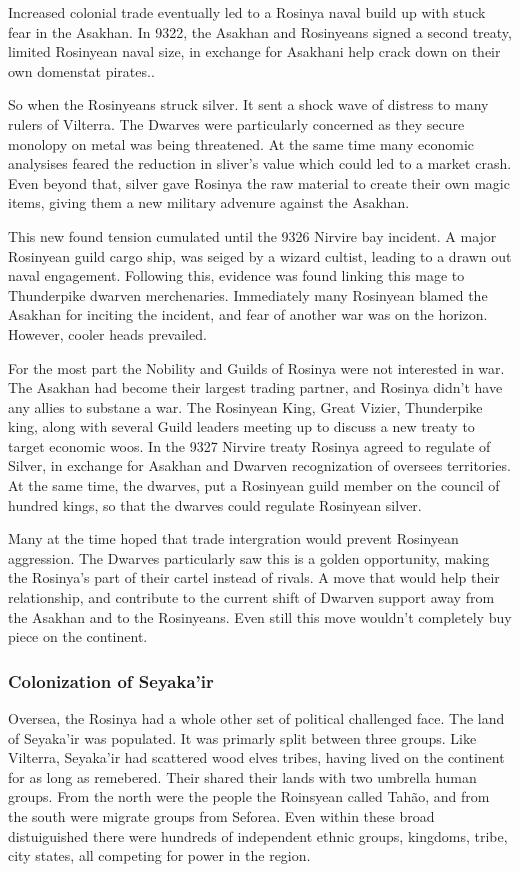 \documentclass[../main.tex]{subfiles}
\begin{document}
Increased colonial trade eventually led to a Rosinya naval build up with stuck fear in the Asakhan. 
In 9322, the Asakhan and Rosinyeans signed a second treaty, limited Rosinyean naval size, in
exchange for Asakhani help crack down on their own domenstat pirates..

So when the Rosinyeans struck silver. It sent a shock wave of distress to many rulers of Vilterra.
The Dwarves were particularly concerned as they secure monolopy on metal was being threatened. 
At the same time many economic analysises feared the reduction in sliver's value which could led
to a market crash. Even beyond that, silver gave Rosinya the raw material to create their own 
magic items, giving them a new military advenure against the Asakhan. 

This new found tension cumulated until the 9326 Nirvire bay incident. A major Rosinyean guild 
cargo ship, was seiged by a wizard cultist, leading to a drawn out naval engagement. Following 
this, evidence was found linking this mage to Thunderpike dwarven merchenaries. Immediately 
many Rosinyean blamed the Asakhan for inciting the incident, and fear of another war was on
the horizon. However, cooler heads prevailed. 

For the most part the Nobility and Guilds of Rosinya were not interested in war. The Asakhan 
had become their largest trading partner, and Rosinya didn't have any allies to substane a 
war. The Rosinyean King, Great Vizier, Thunderpike king, along with several Guild leaders 
meeting up to discuss a new treaty to target economic woos. In the 9327 Nirvire treaty 
Rosinya agreed to regulate of Silver, in exchange for Asakhan and Dwarven recognization 
of oversees territories. At the same time, the dwarves, put a Rosinyean guild member on the 
council of hundred kings, so that the dwarves could regulate Rosinyean silver.

Many at the time hoped that trade intergration would prevent Rosinyean aggression. The 
Dwarves particularly saw this is a golden opportunity, making the Rosinya's part of their
cartel instead of rivals. A move that would help their relationship, and contribute to 
the current shift of Dwarven support away from the Asakhan and to the Rosinyeans. Even 
still this move wouldn't completely buy piece on the continent.

\subsubsection{Colonization of Seyaka'ir}
Oversea, the Rosinya had a whole other set of political challenged face. The land of 
Seyaka'ir was populated. It was primarly split between three groups. Like Vilterra,
Seyaka'ir had scattered wood elves tribes, having lived on the continent for as long 
as remebered. Their shared their lands with two umbrella human groups. From the north
were the people the Roinsyean called Tahão, and from the south were migrate groups
from Seforea. Even within these broad distuiguished there were hundreds of independent
ethnic groups, kingdoms, tribe, city states, all competing for power in the region.
\end{document}
